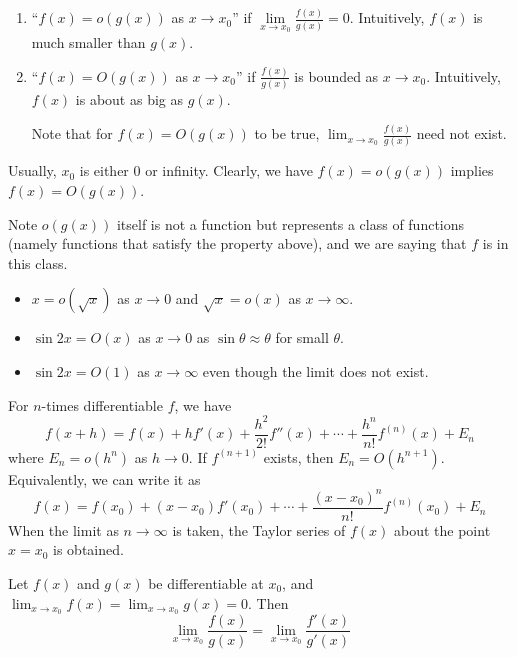 \documentclass[a4paper]{article}
\begin{document}
\begin{defi}\leavevmode
  \begin{enumerate}
    \item ``$f(x) = o(g(x))$ as $x\to x_0$'' if $\lim\limits_{x\to x_0} \frac{f(x)}{g(x)} = 0$. Intuitively, $f(x)$ is much smaller than $g(x)$.
    \item ``$f(x) = O(g(x))$ as $x\to x_0$'' if $\frac{f(x)}{g(x)}$ is bounded as $x\to x_0$. Intuitively, $f(x)$ is about as big as $g(x)$.

      Note that for $f(x) = O(g(x))$ to be true, $\displaystyle \lim_{x\to x_0} \frac{f(x)}{g(x)}$ need not exist.
  \end{enumerate}
  Usually, $x_0$ is either $0$ or infinity. Clearly, we have $f(x)=o(g(x))$ implies $f(x) = O(g(x))$.
\end{defi}
Note $o(g(x))$ itself is not a function but represents a class of functions (namely functions that satisfy the property above), and we are saying that $f$ is in this class.
\begin{eg}\leavevmode
  \begin{itemize}
    \item $x=o(\sqrt{x})$ as $x\to 0$ and $\sqrt{x} = o(x)$ as $x\to \infty$.
    \item $\sin 2x = O(x)$ as $x\to 0$ as $\sin \theta \approx \theta$ for small $\theta$.
    \item $\sin 2x = O(1)$ as $x\to \infty$ even though the limit does not exist.
  \end{itemize}
\end{eg}
\newpage
\begin{thm}
  For $n$-times differentiable $f$, we have
  \begin{equation}
f(x + h) = f(x) + hf'(x) + \frac{h^2}{2!}f''(x) + \cdots + \frac{h^n}{n!}f^{(n)}(x) + E_n\tag{6.2a}
\end{equation}
  where $E_n = o(h^{n})$ as $h\to 0$. If $f^{(n+1)}$ exists, then $E_n = O(h^{n+1})$. Equivalently, we can write it as
  \begin{equation}
  f(x) = f(x_0) + (x-x_0)f'(x_0) + \cdots + \frac{(x-x_0)^n}{n!}f^{(n)}(x_0) +E_n\tag{6.2b}
  \end{equation}
When the limit as $n\to \infty$ is taken, the Taylor series of $f(x)$ about the point $x = x_0$ is obtained.
\end{thm}
\begin{thm}
  Let $f(x)$ and $g(x)$ be differentiable at $x_0$, and $\displaystyle \lim_{x\to x_0}f(x) = \lim_{x\to x_0}g(x) = 0$. Then
  \begin{equation}
  \lim_{x\to x_0} \frac{f(x)}{g(x)} = \lim_{x\to x_0} \frac{f'(x)}{g'(x)}\tag{6.3}
  \end{equation}
\end{thm}
\end{document}
